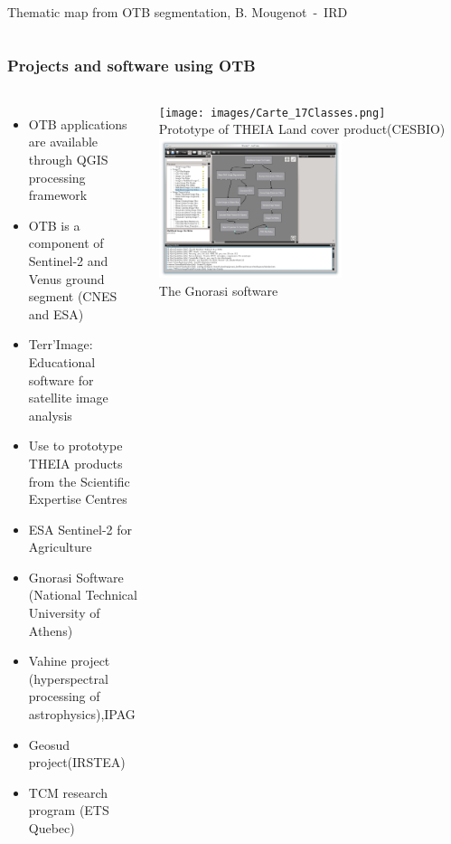 \documentclass[8pt]{beamer}
\begin{document}
\begin{frame}
\begin{columns}
\tiny{Thematic map from OTB segmentation, B. Mougenot~-~IRD}
\end{columns}
\end{frame}

\begin{frame}
\frametitle{Projects and software using OTB}
\begin{columns}
  \begin{itemize}
    \item OTB applications are available through QGIS processing framework
    \item OTB is a component of \alert{Sentinel-2} and Venus ground segment (CNES and ESA)
    \item Terr'Image: Educational software for satellite image analysis
    \item Use to prototype \alert{THEIA} products from the Scientific Expertise Centres
    \item ESA Sentinel-2 for Agriculture
    \item Gnorasi Software (National Technical University of Athens)
    \item Vahine project (hyperspectral processing of astrophysics),IPAG
    \item Geosud project(IRSTEA)
    \item TCM research program (ETS Quebec)
  \end{itemize}
  \begin{center}
  \texttt{[image: images/Carte\_17Classes.png]}\\
  \tiny{Prototype of THEIA Land cover product(CESBIO)}
  \includegraphics[width=0.6\textwidth,height=0.35\textheight]{images/gnorasi2.png}\\
  \tiny{The Gnorasi software}
  \end{center}
\end{columns}
\end{frame}
\end{document}
